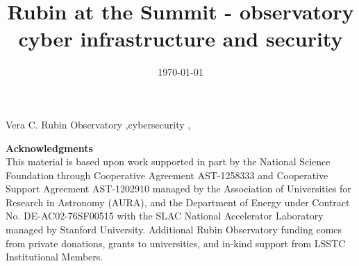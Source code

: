 \documentclass[preprint,12pt]{elsarticle}
\begin{document}
\begin{frontmatter}



\date{\today}
\title{Rubin at the Summit - observatory cyber infrastructure and security}




\begin{keyword}
Vera C. Rubin Observatory \sep cybersecurity \sep


\end{keyword}

\end{frontmatter}





\textbf{Acknowledgments}\\
This material is based upon work supported in part by the National Science Foundation through Cooperative Agreement AST-1258333 and Cooperative Support Agreement AST-1202910 managed by the Association of Universities for Research in Astronomy (AURA), and the Department of Energy under Contract No. DE-AC02-76SF00515 with the SLAC National Accelerator Laboratory managed by Stanford University.
Additional Rubin Observatory funding comes from private donations, grants to universities, and in-kind support from LSSTC Institutional Members.






\end{document}
